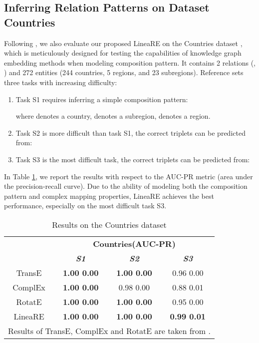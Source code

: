 \documentclass[conference]{IEEEtran}
\begin{document}
\subsection{Inferring Relation Patterns on Dataset Countries}
Following \cite{Bouchard2015On,nickel2016holographic,RotatE}, we also evaluate our proposed LineaRE on the Countries dataset \cite{Bouchard2015On, nickel2016holographic}, which is meticulously designed for testing the capabilities of knowledge graph embedding methods when modeling composition pattern. It contains 2 relations (, ) and 272 entities (244 countries, 5 regions, and 23 subregions). Reference \cite{nickel2016holographic} sets three tasks with increasing difficulty:
\begin{enumerate}
	\item Task S1 requires inferring a simple composition pattern:
	\begin{center}
		
	\end{center}
	where  denotes a country,  denotes a subregion,  denotes a region.
	\item Task S2 is more difficult than task S1, the correct triplets can be predicted from:
	\begin{center}
		
	\end{center}
	\item Task S3 is the most difficult task, the correct triplets can be predicted from:
	\begin{center}
		
	\end{center}
\end{enumerate}
In Table \ref{Countries}, we report the results with respect to the AUC-PR metric (area under the precision-recall curve). Due to the ability of modeling both the composition pattern and complex mapping properties, LineaRE achieves the best performance, especially on the most difficult task S3.

\begin{table}[t]
	\caption{Results on the Countries dataset}
	\begin{center}
		\begin{tabular}{|c|c|c|c|}
			\hline
			\textbf{}&\multicolumn{3}{|c|}{\textbf{Countries(AUC-PR)}} \\
			\cline{2-4} 
			\textbf{} & \textbf{\textit{S1}}& \textbf{\textit{S2}}& \textbf{\textit{S3}} \\
			\hline
			TransE
			& \textbf{1.00  0.00}	& \textbf{1.00  0.00}	& 0.96  0.00  \\
			ComplEx
			& \textbf{1.00  0.00}	& 0.98  0.00	& 0.88  0.01  \\
			RotatE
			& \textbf{1.00  0.00}	& \textbf{1.00  0.00}	& 0.95  0.00  \\
			\hline
			LineaRE
			& \textbf{1.00  0.00}	& \textbf{1.00  0.00}	& \textbf{0.99  0.01}  \\
			\hline
			\multicolumn{4}{l}{Results of TransE, ComplEx and RotatE are taken from \cite{RotatE}.}
		\end{tabular}
		\label{Countries}
	\end{center}
\end{table}
\end{document}
